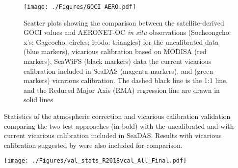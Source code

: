 \documentclass[]{interact}
\theoremstyle{plain}%
\theoremstyle{definition}
\theoremstyle{remark}
\begin{document}
\begin{figure}[htbp!]
  \centering
    \texttt{[image: ./Figures/GOCI\_AERO.pdf]}

    \caption{Scatter plots showing the comparison between the satellite-derived GOCI values and AERONET-OC {\it in situ} observations (Socheongcho: x's; Gageocho: circles; Ieodo: triangles) for the uncalibrated data (blue markers), vicarious calibration based on MODISA (red markers), SeaWiFS (black markers) data the current vicarious calibration included in SeaDAS (magenta markers), and \cite{Wang:13} (green markers) vicarious calibration. The dashed black line is the 1:1 line, and the Reduced Major Axis (RMA) regression line are drawn in solid lines \label{fig:GOCI_AERO} } 
\end{figure}
\begin{table}[H]
\caption{Statistics of the atmospheric correction and vicarious calibration validation comparing the two test approaches (in bold) with the uncalibrated and with current vicarious calibration included in SeaDAS. Results with vicarious calibration suggested by \cite{Wang:13} were also included for comparison. \label{tab:val_stats} }

  \centering
    \texttt{[image: ./Figures/val\_stats\_R2018vcal\_All\_Final.pdf]}

\end{table}
\end{document}
